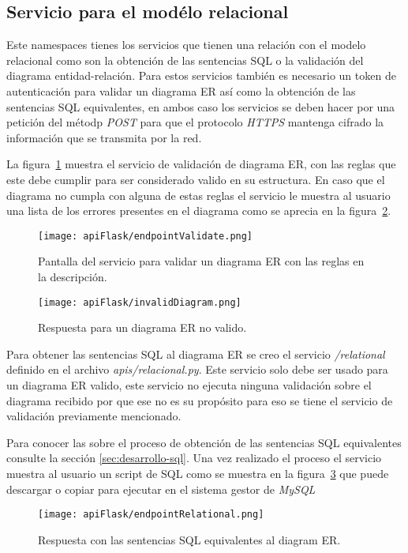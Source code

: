 \subsection{Servicio para el modélo relacional}

Este namespaces tienes los servicios que tienen una relación con el modelo relacional como son la obtención de las sentencias SQL o la validación del diagrama entidad-relación. Para estos servicios también es necesario un token de autenticación para validar un diagrama ER así como la obtención de las sentencias SQL equivalentes, en ambos caso los servicios se deben hacer por una petición del métodp \textit{POST} para que el protocolo \textit{HTTPS} mantenga cifrado la información que se transmita por la red.

La figura~\ref{img:validateER} muestra el servicio de validación de diagrama ER, con las reglas que este debe cumplir para ser considerado valido en su estructura. En caso que el diagrama no cumpla con alguna de estas reglas el servicio le muestra al usuario una lista de los errores presentes en el diagrama como se aprecia en la figura~\ref{img:invalidDiagram}.

\begin{figure}[H]
  \centering
  \texttt{[image: apiFlask/endpointValidate.png]}
  \caption{Pantalla del servicio para validar un diagrama ER con las reglas en la descripción.}
  \label{img:validateER}
\end{figure}

\begin{figure}[H]
  \centering
  \texttt{[image: apiFlask/invalidDiagram.png]}
  \caption{Respuesta para un diagrama ER no valido.}
  \label{img:invalidDiagram}
\end{figure}

Para obtener las sentencias SQL al diagrama ER se creo el servicio \textit{/relational} definido en el archivo \textit{apis/relacional.py}. Este servicio solo debe ser usado para un diagrama ER valido, este servicio no ejecuta ninguna validación sobre el diagrama recibido por que ese no es su propósito para eso se tiene el servicio de validación previamente mencionado.

Para conocer las sobre el proceso de obtención de las sentencias SQL equivalentes consulte la sección \ref{sec:desarrollo-sql}. Una vez realizado el proceso el servicio muestra al usuario un script de SQL como se muestra en la figura~\ref{img:sqlSentences} que puede descargar o copiar para ejecutar en el sistema gestor de \textit{MySQL}


\begin{figure}[H]
  \centering
  \texttt{[image: apiFlask/endpointRelational.png]}
  \caption{Respuesta con las sentencias SQL equivalentes al diagram ER.}
  \label{img:sqlSentences}
\end{figure}